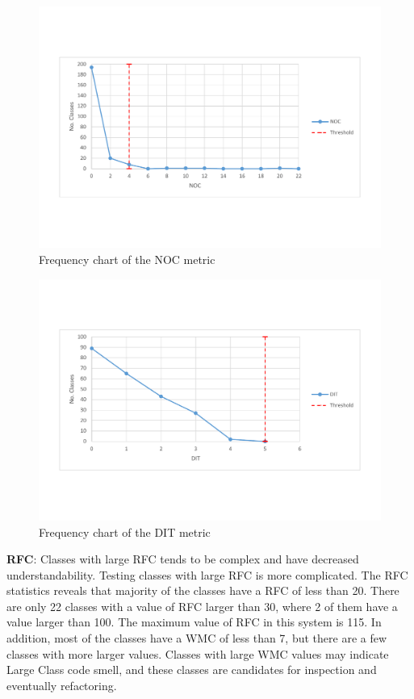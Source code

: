 \begin{figure}[ht!]
	\centering
	\includegraphics[width=\textwidth]{images/threshold/noc.pdf}
	\caption{Frequency chart of the NOC metric}
	\label{fig:nocdistribution}
\end{figure}

\begin{figure}[ht!]
	\centering
	\includegraphics[width=\textwidth]{images/threshold/dit.pdf}
	\caption{Frequency chart of the DIT metric}
	\label{fig:ditdistribution}
\end{figure}


\textbf{RFC}: Classes with large RFC tends to be complex and have decreased understandability. Testing classes with large RFC is more complicated. The RFC statistics reveals that majority of the classes have a RFC of less than 20. There are only 22 classes with a value of RFC larger than 30, where 2 of them have a value larger than 100. The maximum value of RFC in this system is 115. In addition, most of the classes have a WMC of less than 7, but there are a few classes with more larger values. Classes with large WMC values may indicate Large Class code smell, and these classes are candidates for inspection and eventually refactoring. 

